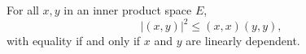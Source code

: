For all $x, y$ in an inner product space $E$,
$$
|(x,y)|^2 \leq (x,x)(y,y),
$$
with equality if and only if $x$ and $y$ are linearly dependent.

